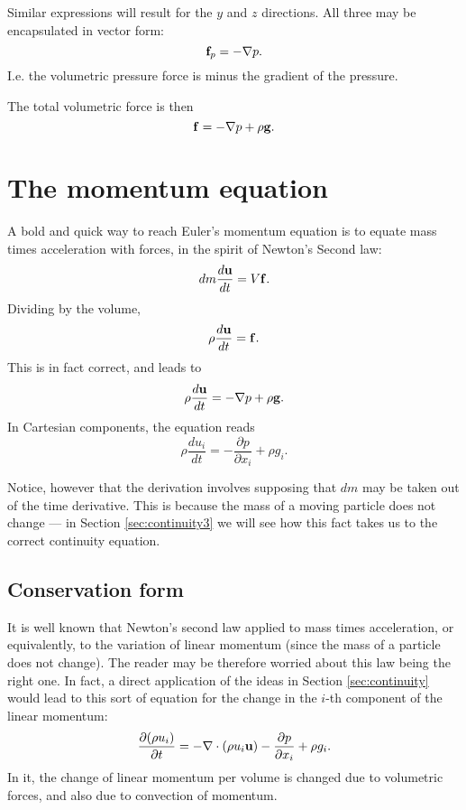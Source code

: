Similar expressions will result for the $y$ and $z$ directions. All
three may be encapsulated in vector form:
\[
\mathbf{f}_p = - \nabla p .
\]
I.e. the volumetric pressure force is minus the gradient of the
pressure.

The total volumetric force is then
\[
\mathbf{f} =  - \nabla p + \rho \mathbf{g} .
\]

\section{The momentum equation}
\label{sec:momentum_eq}

A bold and quick way to reach Euler's momentum equation is to equate
mass times acceleration with forces, in the spirit of Newton's Second
law:
\[
dm \frac{d\mathbf{u}}{dt} = V \mathbf{f} .
\]
Dividing by the volume,
\[
\rho \frac{d\mathbf{u}}{dt} = \mathbf{f} .
\]
This is in fact correct, and leads to
\begin{equation}
  \label{eq:Euler_momentum}
  \rho \frac{d\mathbf{u} }{dt} = - \nabla p + \rho \mathbf{g} .
\end{equation}
In Cartesian components, the equation reads
\begin{equation}
  \label{eq:Euler_momentum_C}
  \rho \frac{d u_i }{dt} =
  - \frac{\partial p} {\partial x_i} 
  + \rho g_i .
\end{equation}

Notice, however that the derivation involves supposing that $dm$ may
be taken out of the time derivative. This is because the mass of a
moving particle does not change --- in Section \ref{sec:continuity3}
we will see how this fact takes us to the correct continuity equation.

\subsection{Conservation form}

It is well known that Newton's second law applied to mass times
acceleration, or equivalently, to the variation of linear momentum
(since the mass of a particle does not change). The reader may be
therefore worried about this law being the right one.  In fact, a
direct application of the ideas in Section \ref{sec:continuity} would
lead to this sort of equation for the change in the $i$-th component
of the linear momentum:
\[
\frac{\partial (\rho u_i) } {\partial t} =
- \nabla \cdot  ( \rho u_i \mathbf{u} )
- \frac{\partial p} {\partial x_i} 
  + \rho g_i .
\]
In it, the change of linear momentum per volume is changed due to
volumetric forces, and also due to convection of momentum.


